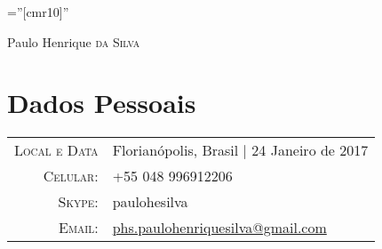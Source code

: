 \documentclass[a4paper,10pt]{article}
\begin{document}
\pagestyle{empty} %

\font\fb=''[cmr10]'' %

\par{\centering
		{\Huge Paulo Henrique \textsc{da Silva}
	}\bigskip\par}

\section{Dados Pessoais}

\begin{tabular}{rl}
    \textsc{Local e Data} & Florianópolis, Brasil  | 24 Janeiro de 2017 \\
    \textsc{Celular:}     & +55 048 996912206\\
    \textsc{Skype:}     & paulohesilva\\
    \textsc{Email:}     & \href{mailto:phs.paulohenriquesilva@gmail.com}{phs.paulohenriquesilva@gmail.com}
\end{tabular}

\end{document}
